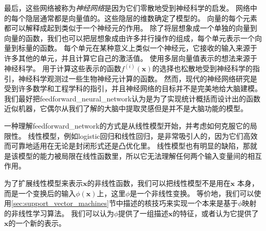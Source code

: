 
最后，这些网络被称为\emph{神经网络}是因为它们零散地受到神经科学的启发。
网络中的每个隐层通常都是向量值的。这些隐层的维数确定了模型的。
向量的每个元素都可以解释成起到类似于一个神经元的作用。
除了将层想象成一个单独的向量到向量的函数，我们也可以把层想象成由许多并行操作的组成，每个单元表示一个向量到标量的函数。
每个单元在某种意义上类似一个神经元，它接收的输入来源于许多其他的单元，并且计算它自己的激活值。
使用多层向量值表示的想法来源于神经科学。
用于计算这些表示的函数$f^{(i)}(\bm{x})$的选择也松散地受到神经科学的指引，神经科学观测过一些生物神经元计算的函数。
然而，现代的神经网络研究是受到许多数学和工程学科的指引，并且神经网络的目标并不是完美地给大脑建模。
我们最好把\gls{feedforward_neural_network}认为是为了实现统计概括而设计出的函数近似机器，它偶尔从我们了解的大脑中提取灵感但是并不是大脑功能的模型。

一种理解\gls{feedforward_network}的方式是从线性模型开始，并考虑如何克服它的局限性。
线性模型，例如logistic回归和线性回归，是非常吸引人的，因为它们高效而可靠地适用在无论是封闭形式还是凸优化里。
线性模型也有明显的缺陷，那就是该模型的能力被局限在线性函数里，所以它无法理解任何两个输入变量间的相互作用。

为了扩展线性模型来表示$\bm{x}$的非线性函数，我们可以把线性模型不是用在$\bm{x}$ 本身，而是一个变换后的输入$\phi(\bm{x})$上，这里$\phi$是一个非线性变换。
等价地，我们可以使用\ref{sec:support_vector_machines}节中描述的核技巧来实现一个本来是基于$\phi$映射的非线性学习算法。
我们可以认为$\phi$提供了一组描述$\bm{x}$的特征，或者认为它提供了$\bm{x}$的一个新的表示。



